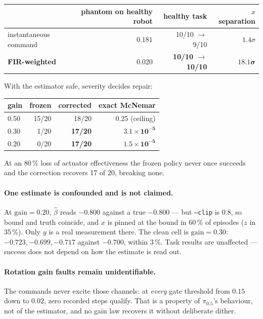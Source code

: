 \documentclass[11pt,a4paper]{article}
\newcommand{\code}[1]{\texttt{\small #1}}
\begin{document}
\begin{center}
\begin{tabular}{lrrr}
\toprule
& phantom on healthy robot & healthy task & $x$ separation \\
\midrule
instantaneous command & $0.181$ & 10/10 $\to$ 9/10 & $1.4\sigma$ \\
\textbf{FIR-weighted} & $\mathbf{0.020}$ & \textbf{10/10 $\to$ 10/10} & $\mathbf{18.1\sigma}$ \\
\bottomrule
\end{tabular}
\end{center}

With the estimator safe, severity decides repair:

\begin{center}
\begin{tabular}{lrrr}
\toprule
gain & frozen & corrected & exact McNemar \\
\midrule
$0.50$ & 15/20 & 18/20 & 0.25 \quad(ceiling) \\
$0.30$ & \phantom{0}1/20 & \textbf{17/20} & $\mathbf{3.1\times 10^{-5}}$ \\
$0.20$ & \phantom{0}0/20 & \textbf{17/20} & $\mathbf{1.5\times 10^{-5}}$ \\
\bottomrule
\end{tabular}
\end{center}

At an 80\,\% loss of actuator effectiveness the frozen policy never once succeeds and the
correction recovers 17 of 20, breaking none.

\paragraph{One estimate is confounded and is not claimed.}
At $\mathrm{gain} = 0.20$, $\hat\beta$ reads $-0.800$ against a true $-0.800$ --- but
\code{--clip} is $0.8$, so bound and truth coincide, and $x$ is pinned at the bound in 60\,\%
of episodes ($z$ in 35\,\%). Only $y$ is a real measurement there. The clean cell is
$\mathrm{gain} = 0.30$: $-0.723, -0.699, -0.717$ against $-0.700$, within 3\,\%. Task results
are unaffected --- success does not depend on how the estimate is read out.

\paragraph{Rotation gain faults remain unidentifiable.}
The commands never excite those channels: at \emph{every} gate threshold from $0.15$ down to
$0.02$, zero recorded steps qualify. That is a property of $\pi_{0.5}$'s behaviour, not of the
estimator, and no gain law recovers it without deliberate dither.
\end{document}

